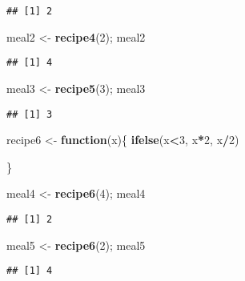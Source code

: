 \documentclass[
]{article}
\newenvironment{Shaded}{\begin{snugshade}}{\end{snugshade}}
\newcommand{\ControlFlowTok}[1]{\textcolor[rgb]{0.13,0.29,0.53}{\textbf{#1}}}
\newcommand{\DecValTok}[1]{\textcolor[rgb]{0.00,0.00,0.81}{#1}}
\newcommand{\KeywordTok}[1]{\textcolor[rgb]{0.13,0.29,0.53}{\textbf{#1}}}
\newcommand{\NormalTok}[1]{#1}
\newcommand{\OperatorTok}[1]{\textcolor[rgb]{0.81,0.36,0.00}{\textbf{#1}}}
\newcommand{\StringTok}[1]{\textcolor[rgb]{0.31,0.60,0.02}{#1}}
\begin{document}
\begin{verbatim}
## [1] 2
\end{verbatim}

\begin{Shaded}
\begin{Highlighting}[]
\NormalTok{meal2 <-}\StringTok{ }\KeywordTok{recipe4}\NormalTok{(}\DecValTok{2}\NormalTok{); meal2}
\end{Highlighting}
\end{Shaded}

\begin{verbatim}
## [1] 4
\end{verbatim}

\begin{Shaded}
\begin{Highlighting}[]
\NormalTok{meal3 <-}\StringTok{ }\KeywordTok{recipe5}\NormalTok{(}\DecValTok{3}\NormalTok{); meal3}
\end{Highlighting}
\end{Shaded}

\begin{verbatim}
## [1] 3
\end{verbatim}

\begin{Shaded}
\begin{Highlighting}[]
\NormalTok{recipe6 <-}\StringTok{ }\ControlFlowTok{function}\NormalTok{(x)\{}
  \KeywordTok{ifelse}\NormalTok{(x}\OperatorTok{<}\DecValTok{3}\NormalTok{, x}\OperatorTok{*}\DecValTok{2}\NormalTok{, x}\OperatorTok{/}\DecValTok{2}\NormalTok{)}
  
\NormalTok{\}}

\NormalTok{meal4 <-}\StringTok{ }\KeywordTok{recipe6}\NormalTok{(}\DecValTok{4}\NormalTok{); meal4}
\end{Highlighting}
\end{Shaded}

\begin{verbatim}
## [1] 2
\end{verbatim}

\begin{Shaded}
\begin{Highlighting}[]
\NormalTok{meal5 <-}\StringTok{ }\KeywordTok{recipe6}\NormalTok{(}\DecValTok{2}\NormalTok{); meal5}
\end{Highlighting}
\end{Shaded}

\begin{verbatim}
## [1] 4
\end{verbatim}
\end{document}
